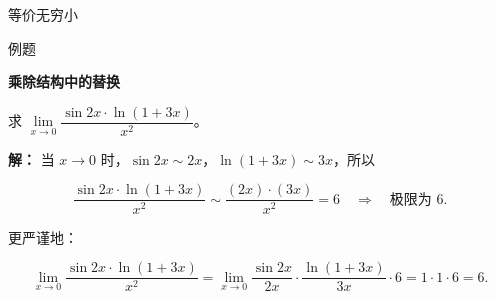 \documentclass[aspectratio=169,10pt,fontset=fandol]{ctexbeamer}
\newenvironment{custom}[1]{\par\noindent\textbf{#1}\quad}{\par\vspace{0.8em}}
\begin{document}
\begin{frame}[t,fragile]{等价无穷小}
\normalsize
\begin{block}{例题}
{\normalsize
\textbf{乘除结构中的替换}\par


求 \(\lim\limits_{x \to 0} \dfrac{\sin 2x \cdot \ln(1+3x)}{x^2}\)。


}
\end{block}
\pause
{\normalsize
\textbf{解：}
当 \(x \to 0\) 时，\(\sin 2x \sim 2x\)，\(\ln(1+3x) \sim 3x\)，所以

\[

\dfrac{\sin 2x \cdot \ln(1+3x)}{x^2} \sim \dfrac{(2x) \cdot (3x)}{x^2} = 6 \quad \Rightarrow \quad \text{极限为 } 6.

\]

更严谨地：

\[

\lim_{x \to 0} \dfrac{\sin 2x \cdot \ln(1+3x)}{x^2} = \lim_{x \to 0} \dfrac{\sin 2x}{2x} \cdot \dfrac{\ln(1+3x)}{3x} \cdot 6 = 1 \cdot 1 \cdot 6 = 6.

\]


}
\end{frame}
\end{document}
